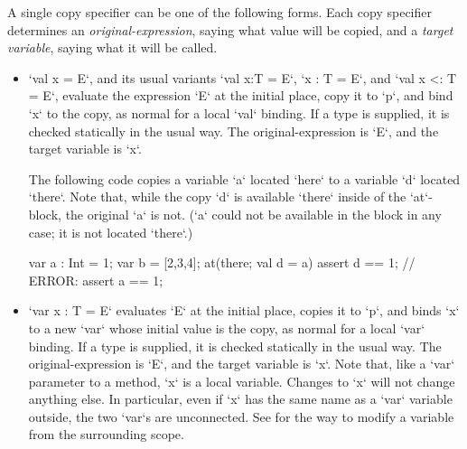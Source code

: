 A single copy specifier can be one of the following forms.   
Each copy specifier determines an {\em original-expression}, saying what value
will be copied, and a {\em target variable}, saying what it will be called.

\begin{itemize}

\item \xcd`val x = E`, and its usual variants \xcd`val x:T = E`, 
      \xcd`x : T = E`, and 
      \xcd`val x <: T = E`, evaluate the expression \xcd`E` at the initial
      place, copy it to \xcd`p`, and bind \xcd`x` to the copy, as normal for a
      local \xcd`val` binding.  If a type is supplied, it is checked
      statically in the usual way.  
      The original-expression is \xcd`E`, and the target variable is \xcd`x`.

\begin{ex}
The following code copies a variable \xcd`a` located \xcd`here` to a variable
\xcd`d` located \xcd`there`.  
Note that, while the copy \xcd`d` is available \xcd`there` inside of the \xcd`at`-block,
the original \xcd`a` is not.  (\xcd`a` could not be available in the block in
any case; it is not located \xcd`there`.)
\begin{xten}
var a : Int = 1;
var b = [2,3,4];
at(there; val d = a) {
   assert d == 1;
   // ERROR: assert a == 1;
}
\end{xten}
% 
\end{ex}

\item \xcd`var x : T = E` evaluates \xcd`E` at the initial place, copies it to
      \xcd`p`, and binds \xcd`x` to a new \xcd`var` whose initial value is the
      copy, as normal for a local \xcd`var` binding.
      If a type is supplied, it is checked
      statically in the usual way.
      The original-expression is \xcd`E`, and the target variable is \xcd`x`.
      Note that, like a \xcd`var` parameter to a method, \xcd`x` is a local
      variable.  Changes to \xcd`x` will not change anything else. In
      particular, even if \xcd`x` has the same name as a \xcd`var` variable
      outside, the two \xcd`var`s are unconnected.  
      See  for the way to modify a variable from the
      surrounding scope.


\end{itemize}
